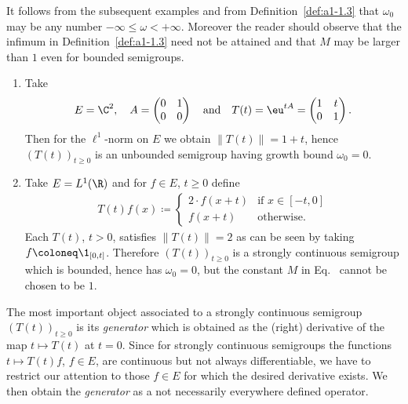 It follows from the subsequent examples and from Definition~\ref{def:a1-1.3} that $\omega_{0}$ may be any number $ -\infty \leq \omega < +\infty$.
Moreover the reader should observe that the infimum in Definition~\ref{def:a1-1.3} need not be attained and that $M$ may be larger than $1$ even for bounded semigroups.
\begin{examples}\label{ex:a1-1.4}
\begin{enumerate}[\upshape(i), wide, labelindent=.25em]

\item 
Take 
\[
	E = \C^{2}, \quad
	A = \begin{pmatrix}0 & 1\\0 & 0\end{pmatrix} 
	\quad \text{and} \quad 
	T(t) =  \eu^{tA} = \begin{pmatrix}1 & t\\0 & 1\end{pmatrix} .
\]
%
Then for the $\ell^{1}$-norm on $E$ we obtain $\|T(t)\| = 1 + t$, hence $(T(t))_{t\geq0}$ is an unbounded semigroup having growth bound $\omega_{0} = 0$.

\item 
Take $E = L^1(\R)$ and for $f \in E$, $t \geq 0$ define
\begin{align*}
T(t)f(x) \coloneqq 
	\begin{cases}
		2\cdot f(x+t) & \text{if } x \in [-t,0] \\
		f(x+t) & \text{otherwise}.
	\end{cases}
\end{align*}
Each $T(t)$, $t > 0$, satisfies $\|T(t)\| = 2$ as can be seen by taking $f \coloneq  \1_{[0,t]}$.
Therefore $(T(t))_{t \geq 0}$ is a strongly continuous semigroup which is bounded, hence has $\omega_{0} = 0$, but the constant $M$ in Eq.~ cannot be chosen to be $1$.

\end{enumerate}
\end{examples} 
The most important object associated to a strongly continuous semigroup $(T(t))_{t\geq0}$ is its \emph{generator} which is obtained as the (right) derivative of the map $t \mapsto T(t)$ at $t = 0$.
Since for strongly continuous semigroups the functions $t \mapsto T(t)f$, $f \in E$, are continuous but not always differentiable, we have to restrict our attention to those $f \in E$ for which the desired derivative exists.
We then obtain the \emph{generator} as a not necessarily everywhere defined operator.
